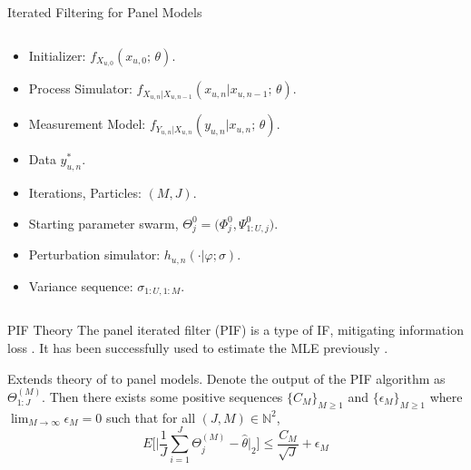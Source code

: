 \documentclass[aspectratio=169]{beamer}\usepackage[]{graphicx}\usepackage[]{xcolor}
\begin{document}
\begin{frame}[plain, t]{Iterated Filtering for Panel Models}
\begin{columns}[t]
\begin{column}{0.35\textwidth}
\vspace{2mm}

  \begin{itemize}
    \footnotesize
    \item Initializer: $f_{X_{u, 0}}(x_{u, 0}; \, \theta)$.
    \item Process Simulator: $f_{X_{u, n}|X_{u, n-1}}(x_{u, n}|x_{u, n-1}; \, \theta)$.
    \item Measurement Model: $f_{Y_{u, n}|X_{u, n}}(y_{u, n}|x_{u, n} ; \, \theta)$. 
    \item Data $y_{u, n}^*$. 
    \item Iterations, Particles: $(M, J)$.
    \item Starting parameter swarm, $\Theta_j^0 = \big(\Phi_j^0, \Psi_{1:U, j}^0\big)$.
    \item Perturbation simulator: $h_{u, n}(\cdot | \varphi; \sigma)$.
    \item Variance sequence: $\sigma_{1:U, 1:M}$.
  \end{itemize}
  
\end{column}

\end{columns}
\end{frame}

\begin{frame}{PIF Theory}
  The panel iterated filter (PIF) is a type of IF, mitigating information loss \citep{breto20}. 
  It has been successfully used to estimate the MLE previously \citep[e.g.,][]{domeyer22}.
  
  \begin{theorem}
    Extends theory of \citet{chen24} to panel models. Denote the output of the PIF algorithm as $\Theta_{1:J}^{(M)}$.
  Then there exists some positive sequences $\{C_M\}_{M \geq 1}$ and $\{\epsilon_M\}_{M \geq 1}$ where $\lim_{M \rightarrow \infty}\epsilon_M = 0$ such that for all $(J, M) \in \mathbb{N}^2$,
  $$
  E\bigg[\Big|\frac{1}{J}\sum_{i=1}^J \Theta_j^{(M)} - \hat{\theta}\Big|_2\bigg] \leq \frac{C_M}{\sqrt{J}} + \epsilon_M
  $$
  \end{theorem}
  
\end{frame}
\end{document}
